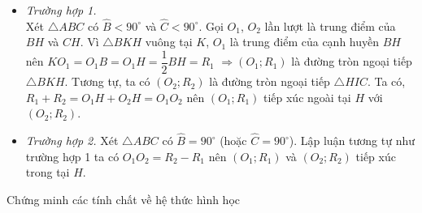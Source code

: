 \begin{vd}
{\begin{center}
	\end{center}
	\begin{itemize}
	\item \textit{Trường hợp 1.} \\
	Xét $\triangle ABC$ có $\widehat{B}<90^\circ$ và $\widehat{C}<90^\circ$. Gọi $O_1$, $O_2$ lần lượt là trung điểm của $BH$ và $CH$. Vì $\triangle BKH$ vuông tại $K$, $O_1$ là trung điểm của cạnh huyền $BH$ nên $KO_1=O_1B=O_1H=\dfrac{1}{2}BH=R_1$ $\Rightarrow \left(O_1;R_1\right)$ là đường tròn ngoại tiếp $\triangle BKH$. Tương tự, ta có $\left(O_2;R_2\right)$ là đường tròn ngoại tiếp $\triangle HIC$. Ta có, $R_1+R_2=O_1H+O_2H=O_1O_2$ nên $\left(O_1;R_1\right)$ tiếp xúc ngoài tại $H$ với $\left(O_2;R_2\right)$.
	\item \textit{Trường hợp 2.} Xét $\triangle ABC$ có $\widehat{B}=90^\circ$ (hoặc $\widehat{C}=90^\circ$). Lập luận tương tự như trường hợp 1 ta có $O_1O_2=R_2-R_1$ nên $\left(O_1;R_1\right)$ và $\left(O_2;R_2\right)$ tiếp xúc trong tại $H$.
	\end{itemize}	
	}
\end{vd}
\begin{dang}{Chứng minh các tính chất về hệ thức hình học}
\end{dang}	

